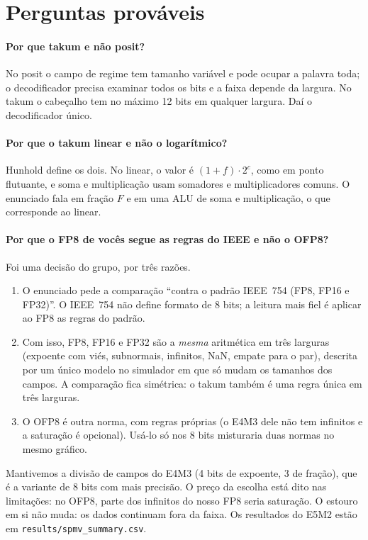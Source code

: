 \documentclass[11pt,a4paper]{article}
\newcommand{\code}[1]{\texttt{#1}}
\begin{document}
\section{Perguntas prováveis}

\paragraph{Por que takum e não posit?} No posit o campo de regime tem tamanho variável e pode ocupar a
palavra toda; o decodificador precisa examinar todos os bits e a faixa depende da largura. No takum o
cabeçalho tem no máximo 12 bits em qualquer largura. Daí o decodificador único.

\paragraph{Por que o takum linear e não o logarítmico?} Hunhold define os dois. No linear, o valor é
$(1+f)\cdot2^c$, como em ponto flutuante, e soma e multiplicação usam somadores e multiplicadores comuns.
O enunciado fala em fração $F$ e em uma ALU de soma e multiplicação, o que corresponde ao linear.

\paragraph{Por que o FP8 de vocês segue as regras do IEEE e não o OFP8?} Foi uma decisão do grupo, por
três razões.
\begin{enumerate}[nosep]
  \item O enunciado pede a comparação ``contra o padrão IEEE~754 (FP8, FP16 e FP32)''. O IEEE~754 não
        define formato de 8 bits; a leitura mais fiel é aplicar ao FP8 as regras do padrão.
  \item Com isso, FP8, FP16 e FP32 são a \emph{mesma} aritmética em três larguras (expoente com viés,
        subnormais, infinitos, NaN, empate para o par), descrita por um único modelo no simulador em que só
        mudam os tamanhos dos campos. A comparação fica simétrica: o takum também é uma regra única em
        três larguras.
  \item O OFP8 é outra norma, com regras próprias (o E4M3 dele não tem infinitos e a saturação é
        opcional). Usá-lo só nos 8 bits misturaria duas normas no mesmo gráfico.
\end{enumerate}
Mantivemos a divisão de campos do E4M3 (4 bits de expoente, 3 de fração), que é a variante de 8 bits com
mais precisão. O preço da escolha está dito nas limitações: no OFP8, parte dos infinitos do nosso FP8
seria saturação. O estouro em si não muda: os dados continuam fora da faixa. Os resultados do E5M2
estão em \code{results/spmv\_summary.csv}.
\end{document}
